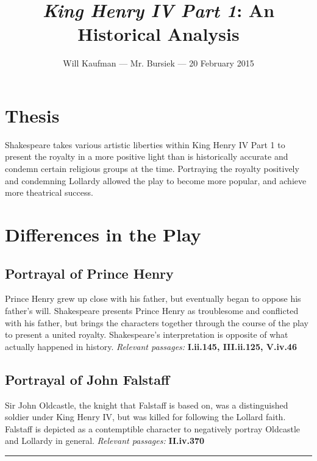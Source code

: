 \documentclass[10pt]{article}
\begin{document}
\title{\textit{King Henry IV Part 1}: An Historical Analysis}
\author{Will Kaufman --- Mr. Bursiek --- 20 February 2015}
\date{}
\maketitle

\section*{Thesis}
Shakespeare takes various artistic liberties within King Henry IV Part 1 to present the royalty in a more positive light than is historically accurate and condemn certain religious groups at the time.  Portraying the royalty positively and condemning Lollardy allowed the play to become more popular, and achieve more theatrical success.

\section*{Differences in the Play}
\subsection*{Portrayal of Prince Henry}
Prince Henry grew up close with his father, but eventually began to oppose his father's will.  Shakespeare presents Prince Henry as troublesome and conflicted with his father, but brings the characters together through the course of the play to present a united royalty.  Shakespeare's interpretation is opposite of what actually happened in history.
\textit{Relevant passages: } \textbf{I.ii.145, III.ii.125, V.iv.46}

\subsection*{Portrayal of John Falstaff}
Sir John Oldcastle, the knight that Falstaff is based on, was a distinguished soldier under King Henry IV, but was killed for following the Lollard faith.  Falstaff is depicted as a contemptible character to negatively portray Oldcastle and Lollardy in general.
\textit{Relevant passages: } \textbf{II.iv.370}

\noindent\rule{\textwidth}{1pt}
\end{document}
